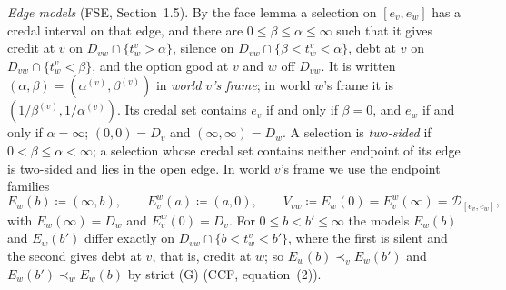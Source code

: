 \documentclass[11pt]{article}
\theoremstyle{definition}\newtheorem{definition}[theorem]{Definition}
\theoremstyle{remark}\newtheorem{remark}[theorem]{Remark}
\newcommand{\Dscr}{\mathcal D}
\begin{document}
\emph{Edge models} (FSE, Section~1.5). By the face lemma a selection on
$[e_v,e_w]$ has a credal interval on that edge, and there are
$0\le\beta\le\alpha\le\infty$ such that it gives credit at $v$ on
$D_{vw}\cap\{t^v_w>\alpha\}$, silence on $D_{vw}\cap\{\beta<t^v_w<\alpha\}$,
debt at $v$ on $D_{vw}\cap\{t^v_w<\beta\}$, and the option good at $v$ and
$w$ off $D_{vw}$. It is written $(\alpha,\beta)=(\alpha^{(v)},\beta^{(v)})$
in \emph{world $v$'s frame}; in world $w$'s frame it is
$(1/\beta^{(v)},1/\alpha^{(v)})$. Its credal set contains $e_v$ if and only
if $\beta=0$, and $e_w$ if and only if $\alpha=\infty$; $(0,0)=D_v$ and
$(\infty,\infty)=D_w$. A selection is \emph{two-sided} if
$0<\beta\le\alpha<\infty$; a selection whose credal set contains neither
endpoint of its edge is two-sided and lies in the open edge. In world $v$'s
frame we use the endpoint families
\[
 E_w(b)\coloneqq(\infty,b),\qquad E^w_v(a)\coloneqq(a,0),
 \qquad V_{vw}\coloneqq E_w(0)=E^w_v(\infty)=\Dscr_{[e_v,e_w]},
\]
with $E_w(\infty)=D_w$ and $E^w_v(0)=D_v$. For $0\le b<b'\le\infty$ the
models $E_w(b)$ and $E_w(b')$ differ exactly on $D_{vw}\cap\{b<t^v_w<b'\}$,
where the first is silent and the second gives debt at $v$, that is, credit
at $w$; so $E_w(b)\prec_vE_w(b')$ and $E_w(b')\prec_wE_w(b)$ by strict (G)
(CCF, equation~(2)).
\end{document}
